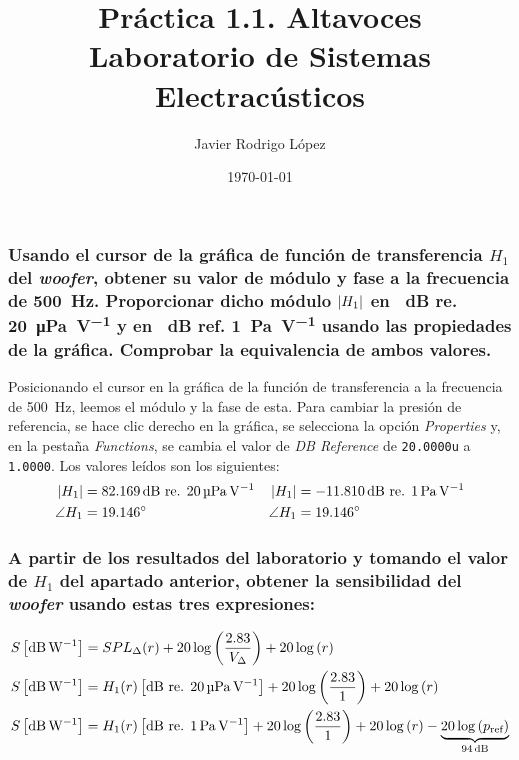 \documentclass[10pt]{article}
\title{\Huge Práctica 1.1. Altavoces \\\huge Laboratorio de Sistemas Electracústicos}
\author{Javier Rodrigo López}
\date{\today}
\begin{document}
\maketitle

\subsubsection{Usando el cursor de la gráfica de función de transferencia $H_1$ del \textit{woofer}, obtener su valor de módulo y fase a la frecuencia de \SI{500}{\Hz}. Proporcionar dicho módulo $\abs{H_1}$ en \SI{}{\dB} re. \SI{20}{\micro\pascal\per\volt} y en \SI{}{\dB} ref. \SI{1}{\pascal\per\volt} usando las propiedades de la gráfica. Comprobar la equivalencia de ambos valores.}

Posicionando el cursor en la gráfica de la función de transferencia a la frecuencia de \SI{500}{\Hz}, leemos el módulo y la fase de esta. Para cambiar la presión de referencia, se hace clic derecho en la gráfica, se selecciona la opción \textit{Properties} y, en la pestaña \textit{Functions}, se cambia el valor de \textit{DB Reference} de \verb|20.0000u| a \verb|1.0000|. Los valores leídos son los siguientes:
\begin{align*}
  \abs{H_1}   & = \SI{82.169}{\dB} \text{ re. } \SI{20}{\micro\pascal\per\volt} & \abs{H_1}   & = \SI{-11.810}{\dB} \text{ re. } \SI{1}{\pascal\per\volt} \\
  \angle{H_1} & = \SI{19.146}{\degree}                                          & \angle{H_1} & = \SI{19.146}{\degree}
\end{align*}


\subsubsection{A partir de los resultados del laboratorio y tomando el valor de $H_1$ del apartado anterior, obtener la sensibilidad del \textit{woofer} usando estas tres expresiones:}
\begin{align}
  S \left[ \SI{}{\dB\per\watt} \right] & = SPL_{\Delta} (r) + 20 \log \left( \frac{2.83}{V_{\Delta}} \right) + 20 \log \left( r \right)                                                                                                                       \\ \label{eq:sens_2}
  S \left[ \SI{}{\dB\per\watt} \right] & = H_1(r) \left[ \SI{}{\dB}\text{ re. }\SI{20}{\micro\pascal\per\volt} \right] + 20 \log \left( \frac{2.83}{1} \right) + 20 \log \left( r \right)                                                                     \\ \label{eq:sens_3}
  S \left[ \SI{}{\dB\per\watt} \right] & = H_1(r) \left[ \SI{}{\dB}\text{ re. }\SI{1}{\pascal\per\volt} \right] + 20 \log \left( \frac{2.83}{1} \right) + 20 \log \left( r \right) - \underbrace{20 \log \left( p _{\textnormal{ref}} \right)}_{\SI{94}{\dB}}
\end{align}
\end{document}
